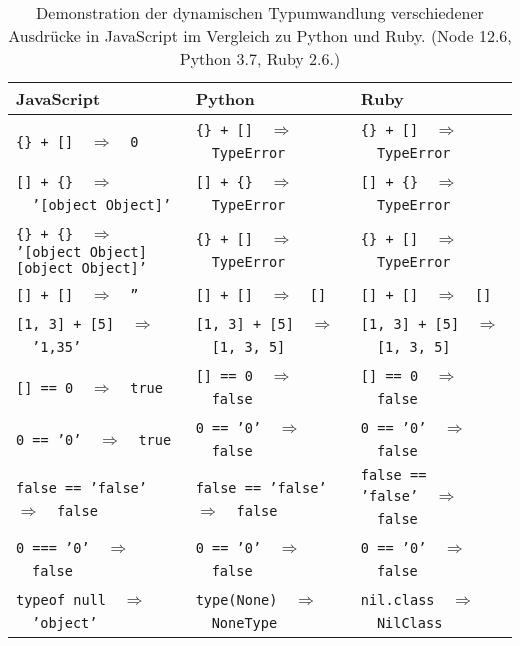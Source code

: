 \begin{table}[tb]
  \footnotesize
  \begin{tabularx}{\textwidth}{@{}p{5.5cm}XX@{}}
    \midrule
    \textbf{JavaScript} & \textbf{Python} & \textbf{Ruby} \\
    \midrule
    \texttt{\{\} + []}~~$\Rightarrow$~~\texttt{0} & \texttt{\{\} + []}~~$\Rightarrow$~~\texttt{TypeError} & \texttt{\{\} + []}~~$\Rightarrow$~~\texttt{TypeError} \\
    \texttt{[] + \{\}}~~$\Rightarrow$~~\texttt{'[object Object]'} & \texttt{[] + \{\}}~~$\Rightarrow$~~\texttt{TypeError} & \texttt{[] + \{\}}~~$\Rightarrow$~~\texttt{TypeError} \\
    \texttt{\{\} + \{\}}~~$\Rightarrow$\newline\-\hspace{0.5cm}\texttt{'[object Object][object Object]'} & \texttt{\{\} + []}~~$\Rightarrow$~~\texttt{TypeError} & \texttt{\{\} + []}~~$\Rightarrow$~~\texttt{TypeError} \\
    \texttt{[] + []}~~$\Rightarrow$~~\texttt{''} & \texttt{[] + []}~~$\Rightarrow$~~\texttt{[]} & \texttt{[] + []}~~$\Rightarrow$~~\texttt{[]} \\
    \texttt{[1, 3] + [5]}~~$\Rightarrow$~~\texttt{'1,35'} & \texttt{[1, 3] + [5]}~~$\Rightarrow$~~\texttt{[1, 3, 5]} & \texttt{[1, 3] + [5]}~~$\Rightarrow$~~\texttt{[1, 3, 5]} \\
    \texttt{[] == 0}~~$\Rightarrow$~~\texttt{true} & \texttt{[] == 0}~~$\Rightarrow$~~\texttt{false} & \texttt{[] == 0}~~$\Rightarrow$~~\texttt{false} \\
    \texttt{0 == '0'}~~$\Rightarrow$~~\texttt{true} & \texttt{0 == '0'}~~$\Rightarrow$~~\texttt{false} & \texttt{0 == '0'}~~$\Rightarrow$~~\texttt{false} \\
    \texttt{false == 'false'}~~$\Rightarrow$~~\texttt{false} & \texttt{false == 'false'}~~$\Rightarrow$~~\texttt{false} & \texttt{false == 'false'}~~$\Rightarrow$~~\texttt{false} \\
    \texttt{0 === '0'}~~$\Rightarrow$~~\texttt{false} & \texttt{0 == '0'}~~$\Rightarrow$~~\texttt{false} & \texttt{0 == '0'}~~$\Rightarrow$~~\texttt{false} \\
    \texttt{typeof null}~~$\Rightarrow$~~\texttt{'object'} & \texttt{type(None)}~~$\Rightarrow$~~\texttt{NoneType} & \texttt{nil.class}~~$\Rightarrow$~~\texttt{NilClass} \\
    \midrule
  \end{tabularx}
  \caption[Dynamische Typumwandlung verschiedener JavaScript-Ausdrücke]{Demonstration der dynamischen Typumwandlung verschiedener Ausdrücke in JavaScript im Vergleich zu Python und Ruby. (Node 12.6, Python 3.7, Ruby 2.6.)}
  \label{tab:js-type-coercion}
\end{table}

